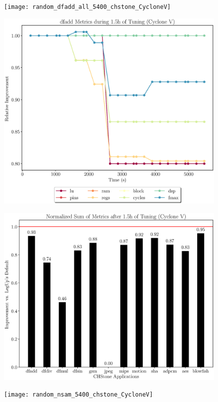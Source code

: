 \documentclass[12pt, a4paper]{article}
\begin{document}
\begin{figure}[htpb]
    \begin{minipage}{.48\textwidth}
        \texttt{[image: random\_dfadd\_all\_5400\_chstone\_CycloneV]}
    \end{minipage}%
    \hfill
    \begin{minipage}{.48\textwidth}
        \includegraphics[scale=.25]{dfadd_all_5400_chstone_CycloneV}
    \end{minipage}%
\end{figure}

\newpage

\begin{figure}[htpb]
    \centering
    \begin{minipage}{.48\textwidth}
        \centering
        \includegraphics[scale=.25]{nsam_5400_chstone_CycloneV}
    \end{minipage}%
    \hfill
    \begin{minipage}{.48\textwidth}
        \centering
        \texttt{[image: random\_nsam\_5400\_chstone\_CycloneV]}
    \end{minipage}%
\end{figure}
\end{document}
